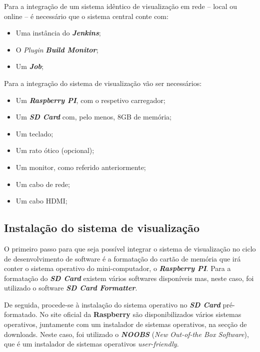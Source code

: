\hspace{1cm}Para a integração de um sistema idêntico de visualização em rede -- local ou online -- é necessário que o sistema central conte com:

\begin{itemize}
  \item Uma instância do \textbf{\textit{Jenkins}};
  \item O \textit{Plugin} \textbf{\textit{Build Monitor}};
  \item Um \textbf{\textit{Job}};
\end{itemize}

\hspace{1cm}Para a integração do sistema de visualização vão ser necessários:

\begin{itemize}
  \item Um \textbf{\textit{Raspberry PI}}, com o respetivo carregador;
  \item Um \textbf{\textit{SD Card}} com, pelo menos, 8GB de memória;
  \item Um teclado;
  \item Um rato ótico (opcional);
  \item Um monitor, como referido anteriormente;
  \item Um cabo de rede;
  \item Um cabo HDMI;
\end{itemize}

\subsection{Instalação do sistema de visualização}

\hspace{1cm}O primeiro passo para que seja possível integrar o sistema de visualização no ciclo de desenvolvimento de software é a formatação do cartão de memória que irá conter o sistema operativo do mini-computador, o \textbf{\textit{Raspberry PI}}. Para a formatação do \textbf{\textit{SD Card}} existem vários softwares disponíveis mas, neste caso, foi utilizado o software \textbf{\textit{SD Card Formatter}}.

\hspace{1cm}De seguida, procede-se à instalação do sistema operativo no \textbf{\textit{SD Card}} pré-formatado. No site oficial da \textbf{Raspberry} são disponibilizados vários sistemas operativos, juntamente com um instalador de sistemas operativos, na secção de downloads. Neste caso, foi utilizado o \textbf{\textit{NOOBS}} (\textit{New Out-of-the Box Software}), que é um instalador de sistemas operativos \textit{user-friendly}.

